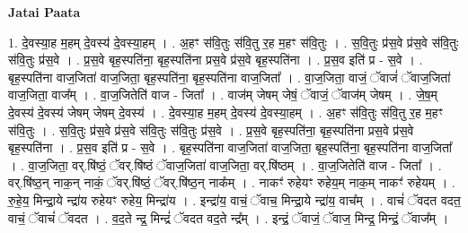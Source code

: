 \documentclass[17pt]{extarticle}
\begin{document}
\textbf{Jatai Paata} \newline

1. दे॒वस्या॒ह म॒हम् दे॒वस्य॑ दे॒वस्या॒हम् । . अ॒हꣳ स॑वि॒तुः स॑वि॒तु र॒ह म॒हꣳ स॑वि॒तुः । . स॒वि॒तुः प्र॑स॒वे प्र॑स॒वे स॑वि॒तुः स॑वि॒तुः प्र॑स॒वे । . प्र॒स॒वे बृह॒स्पति॑ना॒ बृह॒स्पति॑ना प्रस॒वे प्र॑स॒वे बृह॒स्पति॑ना । . प्र॒स॒व इति॑ प्र - स॒वे । . बृह॒स्पति॑ना वाज॒जिता॑ वाज॒जिता॒ बृह॒स्पति॑ना॒ बृह॒स्पति॑ना वाज॒जिता᳚ । . वा॒ज॒जिता॒ वाजं॒ ॅवाजं॑ ॅवाज॒जिता॑ वाज॒जिता॒ वाज᳚म् । . वा॒ज॒जितेति॑ वाज - जिता᳚ । . वाज॑म् जेषम् जेषं॒ ॅवाजं॒ ॅवाज॑म् जेषम् । . जे॒ष॒म् दे॒वस्य॑ दे॒वस्य॑ जेषम् जेषम् दे॒वस्य॑ । . दे॒वस्या॒ह म॒हम् दे॒वस्य॑ दे॒वस्या॒हम् । . अ॒हꣳ स॑वि॒तुः स॑वि॒तु र॒ह म॒हꣳ स॑वि॒तुः । . स॒वि॒तुः प्र॑स॒वे प्र॑स॒वे स॑वि॒तुः स॑वि॒तुः प्र॑स॒वे । . प्र॒स॒वे बृह॒स्पति॑ना॒ बृह॒स्पति॑ना प्रस॒वे प्र॑स॒वे बृह॒स्पति॑ना । . प्र॒स॒व इति॑ प्र - स॒वे । . बृह॒स्पति॑ना वाज॒जिता॑ वाज॒जिता॒ बृह॒स्पति॑ना॒ बृह॒स्पति॑ना वाज॒जिता᳚ । . वा॒ज॒जिता॒ वर्.षि॑ष्ठं॒ ॅवर्.षि॑ष्ठं ॅवाज॒जिता॑ वाज॒जिता॒ वर्.षि॑ष्ठम् । . वा॒ज॒जितेति॑ वाज - जिता᳚ । . वर्.षि॑ष्ठ॒न् नाक॒न् नाकं॒ ॅवर्.षि॑ष्ठं॒ ॅवर्.षि॑ष्ठ॒न् नाक᳚म् । . नाकꣳ॑ रुहेयꣳ रुहेय॒म् नाक॒म् नाकꣳ॑ रुहेयम् । . रु॒हे॒य॒ मिन्द्रा॒ये न्द्रा॑य रुहेयꣳ रुहेय॒ मिन्द्रा॑य । . इन्द्रा॑य॒ वाचं॒ ॅवाच॒ मिन्द्रा॒ये न्द्रा॑य॒ वाच᳚म् । . वाचं॑ ॅवदत वदत॒ वाचं॒ ॅवाचं॑ ॅवदत । . व॒द॒ते न्द्र॒ मिन्द्रं॑ ॅवदत वद॒ते न्द्र᳚म् । . इन्द्रं॒ ॅवाजं॒ ॅवाज॒ मिन्द्र॒ मिन्द्रं॒ ॅवाज᳚म् । \newline
\end{document}
